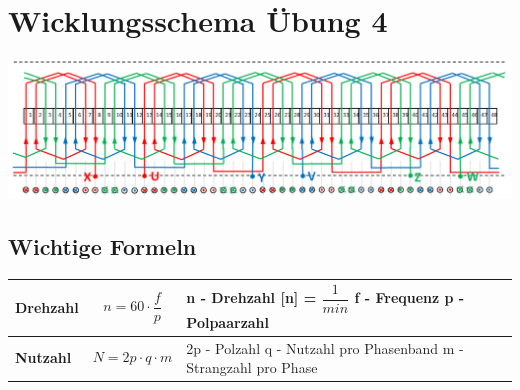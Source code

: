 \section{Wicklungsschema Übung 4}
\includegraphics[scale = 0.5]{images/Wicklungsschema}
\subsection{Wichtige Formeln}
\begin{tabular}{|C{0.3\textwidth}|P{0.4\textwidth}|P{0.3\textwidth}}
	\hline
	\textbf{Drehzahl} & \[n = 60\cdot \dfrac{f}{p}\] & \vspace{0.05cm}n - Drehzahl [n] = $\dfrac{1}{min}$ \newline 
													   f - Frequenz \newline
													   p - Polpaarzahl 
\\ \hline
	\textbf{Nutzahl} & \[ N = 2p\cdot q\cdot m\] & 2p - Polzahl \newline 
												   q - Nutzahl pro Phasenband \newline
												   m - Strangzahl pro Phase
\\ \hline						 
\end{tabular}

